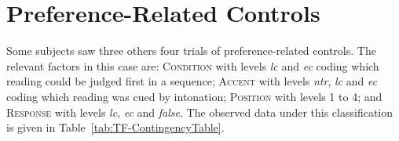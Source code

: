 \documentclass[fleqn,reqno,10pt]{article}
\begin{document}


\section{Preference-Related Controls}
\label{sec:pref-relat-contr}

Some subjects saw three others four trials of preference-related
controls. The relevant factors in this case are: \textsc{Condition}
with levels \emph{lc} and \emph{ec} coding which reading could be
judged first in a sequence; \textsc{Accent} with levels \emph{ntr},
\emph{lc} and \emph{ec} coding which reading was cued by intonation;
\textsc{Position} with levels 1 to 4; and \textsc{Response} with
levels \emph{lc}, \emph{ec} and \emph{false}. The observed data under
this classification is given in Table~\ref{tab:TF-ContingencyTable}.
%
\end{document}
